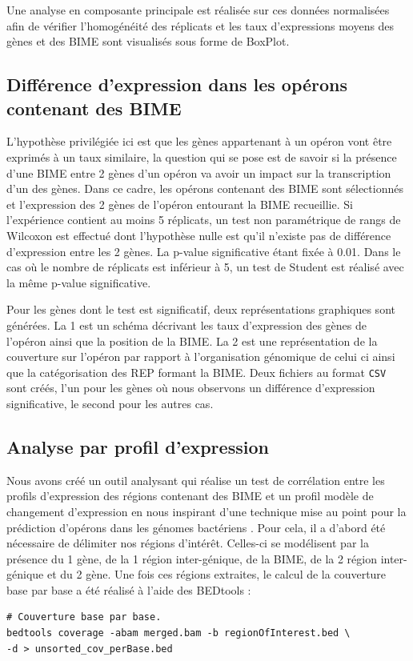 \documentclass[12pt,a4paper]{report}
\begin{document}
\begin{onehalfspace}
Une analyse en composante principale est réalisée sur ces données normalisées afin de vérifier l'homogénéité des réplicats et les taux d'expressions moyens des gènes et des BIME sont visualisés sous forme de BoxPlot.

\subsection*{Différence d'expression dans les opérons contenant des BIME}
L'hypothèse privilégiée ici est que les gènes appartenant à un opéron vont être exprimés à un taux similaire, la question qui se pose est de savoir si la présence d'une BIME entre 2 gènes d'un opéron va avoir un impact sur la transcription d'un des gènes. Dans ce cadre, les opérons contenant des BIME sont sélectionnés et l'expression des 2 gènes de l'opéron entourant la BIME recueillie. Si l'expérience contient au moins 5 réplicats, un test non paramétrique de rangs de Wilcoxon est effectué dont l'hypothèse nulle est qu'il n'existe pas de différence d'expression entre les 2 gènes. La p-value significative étant fixée à 0.01. Dans le cas où le nombre de réplicats est inférieur à 5, un test de Student est réalisé avec la même p-value significative.

Pour les gènes dont le test est significatif, deux représentations graphiques sont générées. La 1 est un schéma décrivant les taux d'expression des gènes de l'opéron ainsi que la position de la BIME. La 2 est une représentation de la couverture sur l'opéron par rapport à l'organisation génomique de celui ci ainsi que la catégorisation des REP formant la BIME. Deux fichiers au format \texttt{CSV} sont créés, l'un pour les gènes où nous observons un différence d'expression significative, le second pour les autres cas.

\subsection*{Analyse par profil d'expression}
Nous avons créé un outil analysant qui réalise un test de corrélation entre les profils d'expression des régions contenant des BIME et un profil modèle de changement d'expression en nous inspirant d'une technique mise au point pour la prédiction d'opérons dans les génomes bactériens \citep{Fortino2014}. Pour cela, il a d'abord été nécessaire de délimiter nos régions d'intérêt. Celles-ci se modélisent par la présence du 1 gène, de la 1 région inter-génique, de la BIME, de la 2 région inter-génique et du 2 gène. Une fois ces régions extraites, le calcul de la couverture base par base a été réalisé à l'aide des BEDtools :
\begin{lstlisting}[frame=single]
# Couverture base par base.
bedtools coverage -abam merged.bam -b regionOfInterest.bed \
-d > unsorted_cov_perBase.bed


\end{lstlisting}
\end{onehalfspace}
\end{document}
